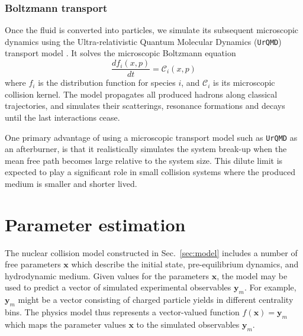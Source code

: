 \documentclass[aps,prc,reprint,amsmath,nofootinbib]{revtex4-1}
\newcommand{\x}{\mathbf{x}}
\newcommand{\y}{\mathbf{y}}
\begin{document}
\subsubsection{Boltzmann transport}

Once the fluid is converted into particles, we simulate its subsequent microscopic dynamics using the Ultra-relativistic Quantum Molecular Dynamics (\texttt{UrQMD}) transport model \cite{Bass:1998ca, Bleicher:1999xi}.
It solves the microscopic Boltzmann equation
\begin{equation}
  \frac{df_i(x, p)}{dt} = \mathcal{C}_i(x, p)
\end{equation}
where $f_i$ is the distribution function for species $i$, and $\mathcal{C}_i$ is its microscopic collision kernel.
The model propagates all produced hadrons along classical trajectories, and simulates their scatterings, resonance formations and decays until the last interactions cease.

One primary advantage of using a microscopic transport model such as \texttt{UrQMD} as an afterburner, is that it realistically simulates the system break-up when the mean free path becomes large relative to the system size.
This dilute limit is expected to play a significant role in small collision systems where the produced medium is smaller and shorter lived.


\section{Parameter estimation}
\label{sec:calibration}

The nuclear collision model constructed in Sec.~\ref{sec:model} includes a number of free parameters $\x$ which describe the initial state, pre-equilibrium dynamics, and hydrodynamic medium.
Given values for the parameters $\x$, the model may be used to predict a vector of simulated experimental observables $\y_m$.
For example, $\y_m$ might be a vector consisting of charged particle yields in different centrality bins.
The physics model thus represents a vector-valued function $f(\x) = \y_m$ which maps the parameter values $\x$ to the simulated observables $\y_m$.
\end{document}

